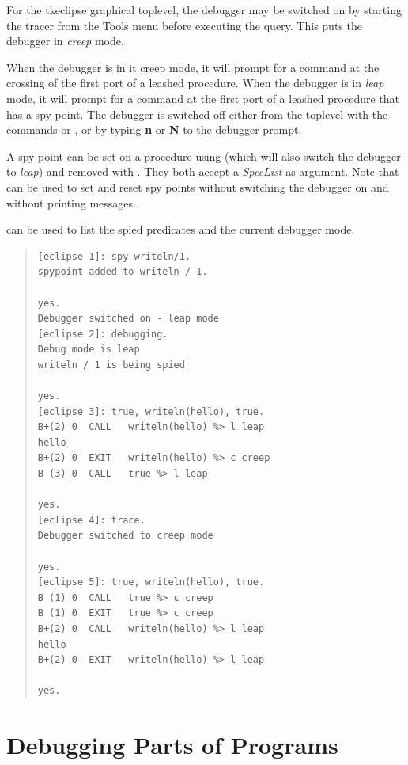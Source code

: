 For the tkeclipse graphical toplevel, the debugger may be switched on by
starting the tracer from the Tools menu before executing the query. This
puts the debugger in {\it creep} mode. 

When the debugger is in {it creep} mode, it will
prompt for a command at the crossing of the first
port of a
leashed procedure.  When the debugger is in {\it leap} mode,
it will prompt for a command at the first port of a leashed
procedure that has a spy point.  The debugger is switched off either
from the toplevel with the commands
 or
, or by
typing {\bf n} or {\bf N} to the debugger prompt.

A spy point can be set on a procedure using
 (which will
 also switch the debugger to {\it leap})
and removed
with .  They
both accept a {\it SpecList} as argument.  Note that
 can
be used to set and reset spy points without switching the debugger on
and without printing messages.

 can be
used to list the spied predicates and the current debugger mode.

\begin{quote}\begin{verbatim}
[eclipse 1]: spy writeln/1.
spypoint added to writeln / 1.

yes.
Debugger switched on - leap mode
[eclipse 2]: debugging.
Debug mode is leap
writeln / 1 is being spied

yes.
[eclipse 3]: true, writeln(hello), true.
B+(2) 0  CALL   writeln(hello) %> l leap
hello
B+(2) 0  EXIT   writeln(hello) %> c creep
B (3) 0  CALL   true %> l leap

yes.
[eclipse 4]: trace.
Debugger switched to creep mode

yes.
[eclipse 5]: true, writeln(hello), true.
B (1) 0  CALL   true %> c creep
B (1) 0  EXIT   true %> c creep
B+(2) 0  CALL   writeln(hello) %> l leap
hello
B+(2) 0  EXIT   writeln(hello) %> l leap

yes.
\end{verbatim}\end{quote}

\section{Debugging Parts of Programs}

